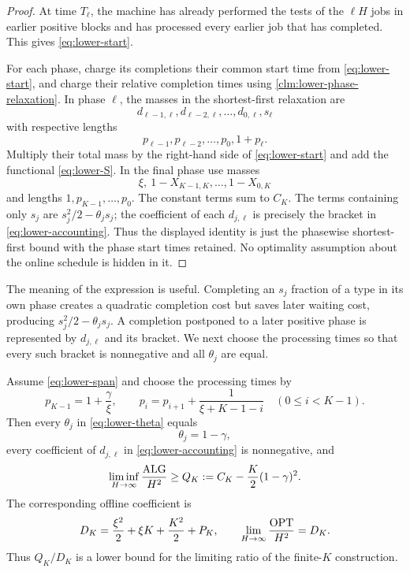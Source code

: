 \begin{proof}
At time $T_\ell$, the machine has already performed the tests of the $\ell H$
jobs in earlier positive blocks and has processed every earlier job that has
completed.  This gives \cref{eq:lower-start}.

For each phase, charge its completions their common start time from
\cref{eq:lower-start}, and charge their relative completion times using
\cref{clm:lower-phase-relaxation}.  In phase $\ell$, the masses in the
shortest-first relaxation are
\[
 d_{\ell-1,\ell},d_{\ell-2,\ell},\ldots,d_{0,\ell},s_\ell
\]
with respective lengths
\[
 p_{\ell-1},p_{\ell-2},\ldots,p_0,1+p_\ell.
\]
Multiply their total mass by the right-hand side of
\cref{eq:lower-start} and add the functional
\cref{eq:lower-S}.  In the final phase use masses
\[
 \xi,\ 1-X_{K-1,K},\ldots,1-X_{0,K}
\]
and lengths $1,p_{K-1},\ldots,p_0$.  The constant terms sum to $C_K$.
The terms containing only $s_j$ are $s_j^2/2-\theta_js_j$; the coefficient
of each $d_{j,\ell}$ is precisely the bracket in
\cref{eq:lower-accounting}.  Thus the displayed identity is just the
phasewise shortest-first bound with the phase start times retained.  No
optimality assumption about the online schedule is hidden in it.
\end{proof}

The meaning of the expression is useful.  Completing an $s_j$ fraction of a
type in its own phase creates a quadratic completion cost but saves later
waiting cost, producing $s_j^2/2-\theta_js_j$.  A completion postponed to a
later positive phase is represented by $d_{j,\ell}$ and its bracket.  We next
choose the processing times so that every such bracket is nonnegative and all
$\theta_j$ are equal.

\begin{claim}
\label{clm:lower-harmonic-cancellation}
Assume \cref{eq:lower-span} and choose the processing times by
\begin{equation}
  p_{K-1}=1+\frac{\gamma}{\xi},
  \qquad
  p_i=p_{i+1}+\frac1{\xi+K-1-i}
  \quad(0\le i<K-1).
  \label{eq:lower-harmonic}
\end{equation}
Then every $\theta_j$ in \cref{eq:lower-theta} equals
\begin{equation}
 \theta_j=1-\gamma,
 \label{eq:lower-theta-constant}
\end{equation}
every coefficient of $d_{j,\ell}$ in \cref{eq:lower-accounting} is
nonnegative, and
\begin{equation}
 \liminf_{H\to\infty}\frac{\operatorname{ALG}}{H^2}
 \ge Q_K
 \mathrel{:=} C_K-\frac K2(1-\gamma)^2.
 \label{eq:lower-QK}
\end{equation}
The corresponding offline coefficient is
\begin{equation}
 D_K=\frac{\xi^2}{2}+\xi K+\frac{K^2}{2}+P_K,
 \qquad
 \lim_{H\to\infty}\frac{\operatorname{OPT}}{H^2}=D_K.
 \label{eq:lower-DK}
\end{equation}
Thus $Q_K/D_K$ is a lower bound for the limiting ratio of the finite-$K$
construction.
\end{claim}

